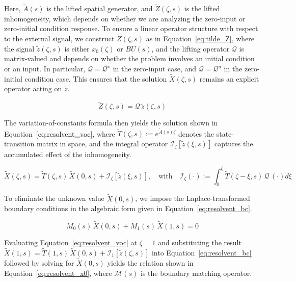 Here, $\tilde{A}(s)$ is the lifted spatial generator, and $\tilde{Z}(\zeta, s)$ is the lifted inhomogeneity, which depends on whether we are analyzing the zero-input or zero-initial condition response. To ensure a linear operator structure with respect to the external signal, we construct $\tilde{Z}(\zeta, s)$ as in Equation~\eqref{eq:tilde_Z}, where the signal $\tilde{z}(\zeta, s)$ is either $x_0(\zeta)$ or $B U(s)$, and the lifting operator $\mathcal{Q}$ is matrix-valued and depends on whether the problem involves an initial condition or an input. In particular, $\mathcal{Q} = \mathcal{Q}^x$ in the zero-input case, and $\mathcal{Q} = \mathcal{Q}^u$ in the zero-initial condition case. This ensures that the solution $\tilde{X}(\zeta, s)$ remains an explicit operator acting on $\tilde{z}$.

\begin{equation} \label{eq:tilde_Z}
\tilde{Z}(\zeta, s) = \mathcal{Q}\, \tilde{z}(\zeta, s)
\end{equation}

The variation-of-constants formula then yields the solution shown in Equation~\eqref{eq:resolvent_voc}, where $\tilde{T}(\zeta, s) := e^{\tilde{A}(s) \zeta}$ denotes the state-transition matrix in space, and the integral operator $\mathcal{I}_\zeta[\tilde{z}(\xi, s)]$ captures the accumulated effect of the inhomogeneity.

\begin{equation} \label{eq:resolvent_voc}
    \tilde{X}(\zeta, s) = \tilde{T}(\zeta, s)\, \tilde{X}(0, s) + \mathcal{I}_\zeta[\tilde{z}(\xi, s)], \quad \text{with} \quad \mathcal{I}_\zeta(\cdot) := \int_0^\zeta \tilde{T}(\zeta - \xi, s)\, \mathcal{Q}\, (\cdot) d\xi
\end{equation}

To eliminate the unknown value $\tilde{X}(0, s)$, we impose the Laplace-transformed boundary conditions in the algebraic form given in Equation~\eqref{eq:resolvent_bc}.

\begin{equation} \label{eq:resolvent_bc}
    M_0(s)\, \tilde{X}(0, s) + M_1(s)\, \tilde{X}(1, s) = 0
\end{equation}

Evaluating Equation~\eqref{eq:resolvent_voc} at $\zeta = 1$ and substituting the result $\tilde{X}(1, s) = \tilde{T}(1, s)\, \tilde{X}(0, s) + \mathcal{I}_1[\tilde{z}(\zeta, s)]$ into Equation~\eqref{eq:resolvent_bc} followed by solving for $\tilde{X}(0, s)$ yields the relation shown in Equation~\eqref{eq:resolvent_x0}, where $\mathcal{M}(s)$ is the boundary matching operator.

